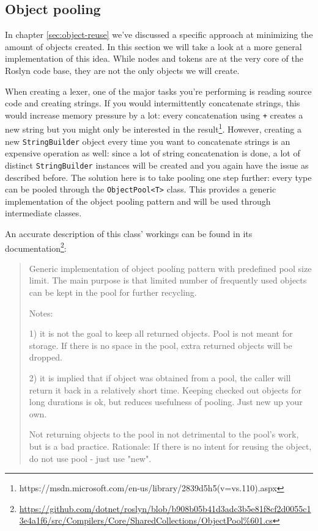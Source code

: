 \subsection{Object pooling}
\label{sec:object-pooling}

In chapter \ref{sec:object-reuse} we've discussed a specific approach at minimizing the amount of objects created. In this section we will take a look at a more general implementation of this idea. While nodes and tokens are at the very core of the Roslyn code base, they are not the only objects we will create. 

When creating a lexer, one of the major tasks you're performing is reading source code and creating strings. If you would intermittently concatenate strings, this would increase memory pressure by a lot: every concatenation using \verb|+| creates a new string but you might only be interested in the result\footnote{https://msdn.microsoft.com/en-us/library/2839d5h5(v=vs.110).aspx}. 
However, creating a new \verb|StringBuilder| object every time you want to concatenate strings is an expensive operation as well: since a lot of string concatenation is done, a lot of distinct \verb|StringBuilder| instances will be created and you again have the issue as described before. The solution here is to take pooling one step further: every type can be pooled through the \verb|ObjectPool<T>| class.\parencite{Warren2014} This provides a generic implementation of the object pooling pattern and will be used through intermediate classes.

An accurate description of this class' workings can be found in its documentation\footnote{\url{https://github.com/dotnet/roslyn/blob/b908b05b41d3adc3b5e81f8cf2d0055c13e4a1f6/src/Compilers/Core/SharedCollections/ObjectPool\%601.cs}}:

\begin{quotation}
Generic implementation of object pooling pattern with predefined pool size limit. The main
purpose is that limited number of frequently used objects can be kept in the pool for
further recycling.

Notes: 

1) it is not the goal to keep all returned objects. Pool is not meant for storage. If there
   is no space in the pool, extra returned objects will be dropped.

2) it is implied that if object was obtained from a pool, the caller will return it back in
   a relatively short time. Keeping checked out objects for long durations is ok, but 
   reduces usefulness of pooling. Just new up your own.

Not returning objects to the pool in not detrimental to the pool's work, but is a bad practice. 
Rationale: 
   If there is no intent for reusing the object, do not use pool - just use "new". 
\end{quotation}

